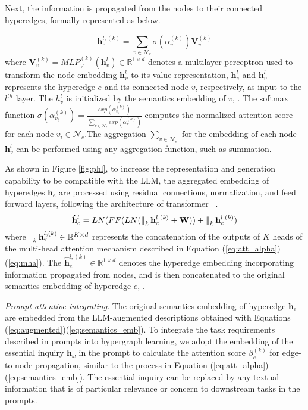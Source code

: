 {Next, the information is propagated from the nodes to their connected hyperedges, formally represented as below.

\begin{equation}
        \mathbf{h}_{e}^{l,(k)} = \sum_{v\in\mathcal{N}_e}\sigma(\alpha_v^{(k)})\mathbf{V}^{(k)}_v 
\label{eq:mha}
\end{equation}
where $\mathbf{V}^{(k)}_v=MLP_V^{(k)}(\mathbf{h}^{l}_{v})\in\mathbb{R}^{1\times d}$ denotes a multilayer perceptron used to transform the node embedding $\mathbf{h}_v^{l}$ to its value representation, $\mathbf{h}_e^{l}$ and $\mathbf{h}_v^l$ represents the hyperedge $e$ and its connected node $v$, respectively, as input to the $l^{th}$ layer. The $h_v^{l}$ is initialized by the semantics embedding of $v$, . The softmax function $\sigma(\alpha_{v_i}^{(k)})=\frac{exp(\alpha^{(k)}_{v_i})}{\sum_{v\in\mathcal{N}_e} exp(\alpha^{(k)}_{v})}$ computes the normalized attention score for each node $v_i\in\mathcal{N}_e$.The aggregation $\sum_{v\in\mathcal{N}_e}$ for the embedding of each node $\mathbf{h}_v^{l}$ can be performed using any aggregation function, such as summation.

As shown in Figure \ref{fig:phl}, to increase the representation and generation capability to be compatible with the LLM, the aggregated embedding of hyperedges $\mathbf{h}_e$ are processed using residual connections, normalization, and feed forward layers, following the architecture of  transformer ~\cite{vaswani2017attention}.
\begin{equation}
   \mathbf{\hat{h}}_e^{l} = LN(FF(LN(\operatorname*{\Vert}\nolimits_k\mathbf{h}_e^{l,(k)}+\mathbf{W}))+\operatorname*{\Vert}\nolimits_k\mathbf{h}_e^{l,(k)})
\end{equation}
where $\operatorname*{\Vert}\nolimits_k\mathbf{h}_e^{l,(k)}\in\mathbb{R}^{K\times d}$ represents the concatenation of the outputs of $K$ heads of the multi-head attention mechanism described in Equation (\ref{eq:att_alpha})(\ref{eq:mha}). The $\mathbf{\hat{h}}_e^{l,(k)}\in\mathbb{R}^{1\times d}$ denotes the hyperedge embedding incorporating information propagated from nodes, and is then concatenated to the original semantics embedding of hyperedge $e$, . 

\textit{Prompt-attentive integrating}. The original semantics embedding of hyperedge $\mathbf{h}_e$ are embedded from the LLM-augmented descriptions obtained with Equations (\ref{eq:augmented})(\ref{eq:semantics_emb}). To integrate the task requirements described in prompts into hypergraph learning, we adopt the embedding of the essential inquiry $\mathbf{h}_{\omega}$ in the prompt to calculate the attention score $\beta_e^{(k)}$ for edge-to-node propagation, similar to the process in Equation (\ref{eq:att_alpha}) (\ref{eq:semantics_emb}). The essential inquiry can be replaced by any textual information that is of particular relevance or concern to downstream tasks in the prompts.

}
